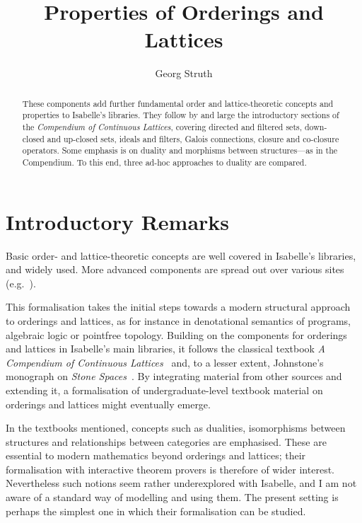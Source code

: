 \documentclass[11pt,a4paper]{article}
\begin{document}
\title{Properties of Orderings and Lattices}
\author{Georg Struth}

\maketitle

\begin{abstract}
  These components add further fundamental order and lattice-theoretic
  concepts and properties to Isabelle's libraries.  They follow by and
  large the introductory sections of the \emph{Compendium of
    Continuous Lattices},  covering directed and filtered sets,
  down-closed and up-closed sets, ideals and filters, Galois
  connections, closure and co-closure operators. Some emphasis is on
  duality and morphisms between structures---as in the Compendium.  To
  this end, three ad-hoc approaches to duality are compared.
\end{abstract}


\tableofcontents

\section{Introductory Remarks}

Basic order- and lattice-theoretic concepts are well covered in
Isabelle's libraries, and widely used. More advanced components are
spread out over various sites
(e.g.~\cite{Wenzel,Preoteasa11a,Preoteasa11b,ArmstrongS12,GomesS15,Ballarin}).

This formalisation takes the initial steps towards a modern structural
approach to orderings and lattices, as for instance in
denotational semantics of programs, algebraic logic or pointfree
topology.  Building on the components for orderings and lattices in
Isabelle's main libraries, it follows the classical textbook \emph{A
  Compendium of Continuous Lattices}~\cite{GierzHKLMS80} and, to a
lesser extent, Johnstone's monograph on \emph{Stone
  Spaces}~\cite{Johnstone82}. By integrating material from
other sources and extending it, a formalisation of undergraduate-level
textbook material on orderings and lattices might eventually emerge.

In the textbooks mentioned, concepts such as dualities, isomorphisms
between structures and relationships between categories are
emphasised.  These are essential to modern mathematics beyond
orderings and lattices; their formalisation with interactive theorem
provers is therefore of wider interest. Nevertheless such notions seem
rather underexplored with Isabelle, and I am not aware of a standard
way of modelling and using them. The present setting is perhaps the
simplest one in which their formalisation can be studied.
\end{document}
